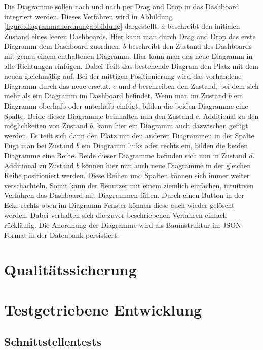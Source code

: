 Die Diagramme sollen nach und nach per Drag and Drop in das Dashboard integriert werden. Dieses Verfahren
wird in Abbildung \ref{figure:diagrammanordnungabbildung} dargestellt. \(a\) beschreibt den
initialen Zustand eines leeren Dashboards. Hier kann man durch Drag and Drop das erste Diagramm dem Dashboard
zuordnen. \(b\) beschreibt den Zustand des Dashboards mit genau einem enthaltenen Diagramm. Hier kann man das
neue Diagramm in alle Richtungen einfügen. Dabei Teilt das bestehende Diagram den Platz mit dem neuen gleichmäßig
auf. Bei der mittigen Positionierung wird das vorhandene Diagramm durch das neue ersetzt. \(c\) und \(d\)
beschreiben den Zustand, bei dem sich mehr als ein Diagramm im Dashboard befindet. Wenn man im Zustand \(b\)
ein Diagramm oberhalb oder unterhalb einfügt, bilden die beiden Diagramme eine Spalte. Beide dieser Diagramme
beinhalten nun den Zustand \(c\). Additional zu den möglichkeiten von Zustand \(b\), kann hier ein Diagramm
auch dazwischen gefügt werden. Es teilt sich dann den Platz mit den anderen Diagrammen in der Spalte.
Fügt man bei Zustand \(b\) ein Diagramm links oder rechts ein, bilden die beiden Diagramme eine Reihe.
Beide dieser Diagramme befinden sich nun in Zustand \(d\). Additional zu Zustand \(b\) können hier nun
auch neue Diagramme in der gleichen Reihe positioniert werden. Diese Reihen und Spalten können sich
immer weiter verschachteln. Somit kann der Benutzer mit einem ziemlich einfachen, intuitiven Verfahren
das Dashboard mit Diagrammen füllen. Durch einen Button in der Ecke rechts oben im Diagramm-Fenster
können diese auch wieder gelöscht werden. Dabei verhalten sich die zuvor beschriebenen Verfahren einfach rückläufig.
Die Anordnung der Diagramme wird als Baumstruktur im JSON-Format in der Datenbank persistiert.

\section{Qualitätssicherung}
\label{sec:qualitaetssicherung}

\section{Testgetriebene Entwicklung}

\subsection{Schnittstellentests}


